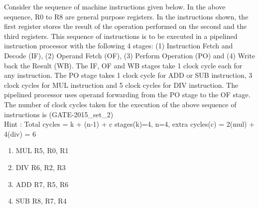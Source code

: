 \begin{questyle}
  \question  Consider the sequence of machine instructions given below. In the above
             sequence, R0 to R8 are general purpose registers. In the instructions shown, the
             first register stores the result of the operation performed on the second and the
             third registers. This sequence of instructions is to be executed in a pipelined
             instruction processor with the following 4 stages: (1) Instruction Fetch and
             Decode (IF), (2) Operand Fetch (OF), (3) Perform Operation (PO) and (4) Write
             back the Result (WB). The IF, OF and WB stages take 1 clock cycle each for any
             instruction. The PO stage takes 1 clock cycle for ADD or SUB instruction, 3 clock cycles
             for MUL instruction and 5 clock cycles for DIV instruction. The pipelined processor
             uses operand forwarding from the PO stage to the OF stage. The number of clock cycles
             taken for the execution of the above sequence of instructions is \fillin[13] (GATE-2015\_set\_2) \\
             Hint : Total cycles = k + (n-1) + c \quad stages(k)=4, n=4,  extra cycles(c) = 2(mul) + 4(div) = 6

             \begin{enumerate}
                \item MUL R5, R0, R1
                \item DIV R6, R2, R3
                \item ADD R7, R5, R6
                \item SUB R8, R7, R4
            \end{enumerate}
\end{questyle}

